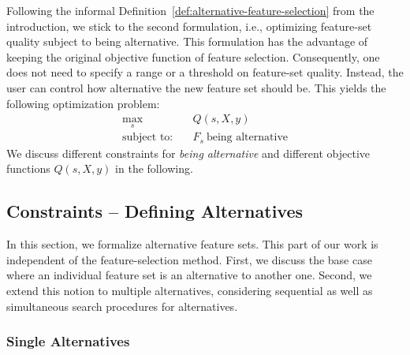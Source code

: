 \documentclass{article}
\theoremstyle{definition}
\begin{document}
Following the informal Definition~\ref{def:alternative-feature-selection} from the introduction, we stick to the second formulation, i.e., optimizing feature-set quality subject to being alternative.
This formulation has the advantage of keeping the original objective function of feature selection.
Consequently, one does not need to specify a range or a threshold on feature-set quality.
Instead, the user can control how alternative the new feature set should be.
This yields the following optimization problem:
%
\begin{equation}
	\begin{split}
		\max_s &\quad Q(s,X,y) \\
		\text{subject to:} &\quad F_s~\text{being alternative}
	\end{split}
	\label{eq:afs}
\end{equation}
%
We discuss different constraints for \emph{being alternative} and different objective functions $Q(s,X,y)$ in the following.

\subsection{Constraints -- Defining Alternatives}
\label{sec:approach:constraints}

In this section, we formalize alternative feature sets.
This part of our work is independent of the feature-selection method.
First, we discuss the base case where an individual feature set is an alternative to another one.
Second, we extend this notion to multiple alternatives, considering sequential as well as simultaneous search procedures for alternatives.

\subsubsection{Single Alternatives}
\label{sec:approach:constraints:single}
\end{document}
